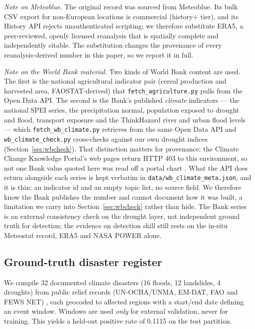 \documentclass[preprint,12pt]{elsarticle}
\begin{document}
\emph{Note on Meteoblue.} The original record was sourced from Meteoblue. Its
bulk CSV export for non-European locations is commercial (history+ tier), and its
History API rejects unauthenticated scripting; we therefore substitute ERA5, a
peer-reviewed, openly licensed reanalysis that is spatially complete and
independently citable. The substitution changes the provenance of every
reanalysis-derived number in this paper, so we report it in full.

\emph{Note on the World Bank material.} Two kinds of World Bank content are
used. The first is the national agricultural indicator pair (cereal production
and harvested area, FAOSTAT-derived) that \texttt{fetch\_agriculture.py} pulls
from the Open Data API. The second is the Bank's published \emph{climate}
indicators --- the national SPEI series, the precipitation normal, population
exposed to drought and flood, transport exposure and the ThinkHazard river and
urban flood levels --- which \texttt{fetch\_wb\_climate.py} retrieves from the same
Open Data API and \texttt{wb\_climate\_check.py} cross-checks against our own
drought indices (Section~\ref{sec:wbcheck}). That distinction matters for
provenance: the Climate Change Knowledge Portal's web pages return HTTP 403 to
this environment, so not one Bank value quoted here was read off a portal chart
\cite{worldbankclimate2026}. What the API does return alongside each series is
kept verbatim in \texttt{data/wb\_climate\_meta.json}, and it is thin: an indicator
id and an empty topic list, no source field. We therefore know the Bank publishes
the number and cannot document how it was built, a limitation we carry into
Section~\ref{sec:wbcheck} rather than hide. The Bank series is an external
consistency check on the drought layer, not independent ground truth for
detection; the evidence on detection skill still rests on the in-situ Meteostat
record, ERA5 and NASA POWER alone.

\subsection{Ground-truth disaster register}\label{sec:register}
We compile 32 documented climate disasters (16 floods, 12 landslides, 4
droughts) from public relief records (UN-OCHA/UNMA, EM-DAT, FAO and FEWS NET)
\cite{emdat2023,unma2022,fewsnet2021}, each geocoded to affected regions with a
start/end date defining an event window. Windows are used \emph{only} for
external validation, never for training. This yields a held-out positive rate
of 0.1115 on the test partition.
\end{document}
